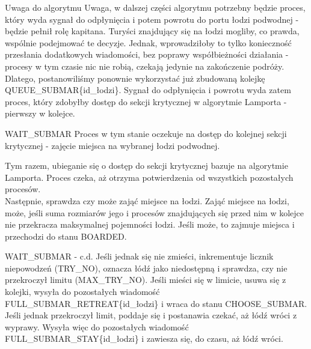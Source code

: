 \documentclass{beamer}
\begin{document}
\begin{frame}{Uwaga do algorytmu}
    \internallinenumbers
    \resetlinenumber[1]
    Uwaga, w dalszej części algorytmu potrzebny będzie proces, który wyda sygnał do odpłynięcia i potem powrotu do portu łodzi podwodnej - będzie pełnił rolę kapitana. Turyści znajdujący się na łodzi mogliby, co prawda, wspólnie podejmować te decyzje. Jednak, wprowadziłoby to tylko konieczność przesłania dodatkowych wiadomości, bez poprawy współbieżności działania - procesy w tym czasie nic nie robią, czekają jedynie na zakończenie podróży. Dlatego, postanowiliśmy ponownie wykorzystać już zbudowaną kolejkę QUEUE\_SUBMAR\{id\_łodzi\}. Sygnał do odpłynięcia i powrotu wyda zatem proces, który zdobyłby dostęp do sekcji krytycznej w algorytmie Lamporta - pierwszy w kolejce.
\end{frame}

\begin{frame}{WAIT\_SUBMAR}
    \internallinenumbers
    \resetlinenumber[1]
    Proces w tym stanie oczekuje na dostęp do kolejnej sekcji krytycznej - zajęcie miejsca na wybranej łodzi podwodnej.

    \vspace{0.4cm}
    Tym razem, ubieganie się o dostęp do sekcji krytycznej bazuje na algorytmie Lamporta. Proces czeka, aż otrzyma potwierdzenia od wszystkich pozostałych procesów. \\
    Następnie, sprawdza czy może zająć miejsce na łodzi. Zająć miejsce na łodzi, może, jeśli suma rozmiarów jego i procesów znajdujących się przed nim w kolejce nie przekracza maksymalnej pojemności łodzi. Jeśli może, to zajmuje miejsca i przechodzi do stanu BOARDED.
\end{frame}

\begin{frame}{WAIT\_SUBMAR - c.d.}
    \internallinenumbers
    \resetlinenumber[1]
    Jeśli jednak się nie zmieści, inkrementuje licznik niepowodzeń (TRY\_NO), oznacza łódź jako niedostępną i sprawdza, czy nie przekroczył limitu (MAX\_TRY\_NO). Jeśli mieści się w limicie, usuwa się z kolejki, wysyła do pozostałych wiadomość FULL\_SUBMAR\_RETREAT\{id\_łodzi\} i wraca do stanu CHOOSE\_SUBMAR. Jeśli jednak przekroczył limit, poddaje się i postanawia czekać, aż łódź wróci z wyprawy. Wysyła więc do pozostałych wiadomość FULL\_SUBMAR\_STAY\{id\_łodzi\} i zawiesza się, do czasu, aż łódź wróci.
\end{frame}
\end{document}
